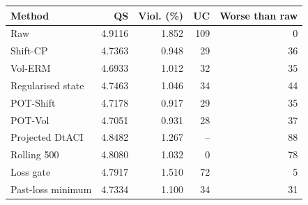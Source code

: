 \begin{tabular}{lrrrr}
\toprule
Method & QS & Viol. (\%) & UC & Worse than raw \\
\midrule
Raw & 4.9116 & 1.852 & 109 & 0 \\
Shift-CP & 4.7363 & 0.948 & 29 & 36 \\
Vol-ERM & 4.6933 & 1.012 & 32 & 35 \\
Regularised state & 4.7463 & 1.046 & 34 & 44 \\
POT-Shift & 4.7178 & 0.917 & 29 & 35 \\
POT-Vol & 4.7051 & 0.931 & 28 & 37 \\
Projected DtACI & 4.8482 & 1.267 & -- & 88 \\
Rolling 500 & 4.8080 & 1.032 & 0 & 78 \\
Loss gate & 4.7917 & 1.510 & 72 & 5 \\
Past-loss minimum & 4.7334 & 1.100 & 34 & 31 \\
\bottomrule
\end{tabular}
